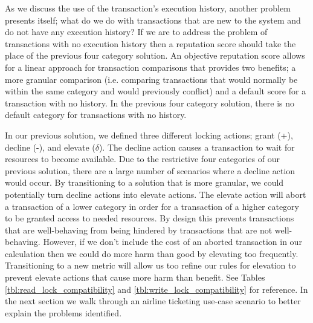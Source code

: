As we discuss the use of the transaction's execution history, another problem presents itself; what do we do with transactions that are new to the system and do not have any execution history? If we are to address the problem of transactions with no execution history then a reputation score should take the place of the previous four category solution. An objective reputation score allows for a linear approach for transaction comparisons that provides two benefits; a more granular comparison (i.e. comparing transactions that would normally be within the same category and would previously conflict) and a default score for a transaction with no history. In the previous four category solution, there is no default category for transactions with no history. 

In our previous solution, we defined three different locking actions; grant (+), decline (-), and elevate ($\delta$). The decline action causes a transaction to wait for resources to become available. Due to the restrictive four categories of our previous solution, there are a large number of scenarios where a decline action would occur. By transitioning to a solution that is more granular, we could potentially turn decline actions into elevate actions. The elevate action will abort a transaction of a lower category in order for a transaction of a higher category to be granted access to needed resources. By design this prevents transactions that are well-behaving from being hindered by transactions that are not well-behaving. However, if we don't include the cost of an aborted transaction in our calculation then we could do more harm than good by elevating too frequently. Transitioning to a new metric will allow us too refine our rules for elevation to prevent elevate actions that cause more harm than benefit. See Tables \ref{tbl:read_lock_compatibility} and \ref{tbl:write_lock_compatibility} for reference. In the next section we walk through an airline ticketing use-case scenario to better explain the problems identified.


